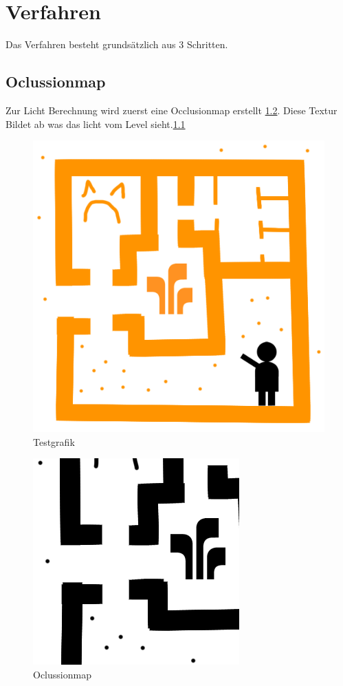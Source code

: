 \chapter{Verfahren}
Das Verfahren besteht grundsätzlich aus 3 Schritten.
\section{Oclussionmap}
Zur Licht Berechnung wird zuerst eine Occlusionmap erstellt \ref{o_1}. Diese Textur Bildet ab was das licht vom Level sieht.\ref{level_1}
\begin{figure}
	\centering
	\includegraphics[scale=0.5]{images/test.png}
	\caption{Testgrafik}
	\label{level_1}
\end{figure}
\begin{figure}
	\centering
	\includegraphics{images/oclusion.png}
	\caption{Oclussionmap}
	\label{o_1}
\end{figure}


